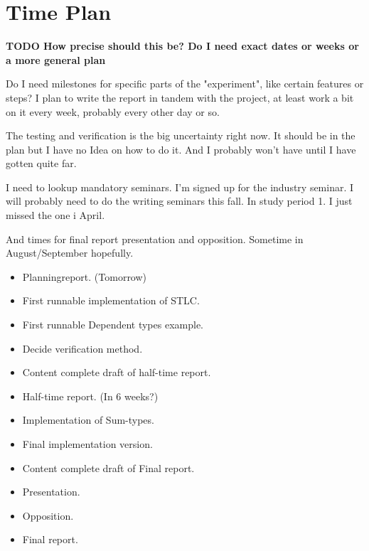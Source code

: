 \documentclass[parskip=half]{scrartcl}
\begin{document}
\section{Time Plan}
\textbf{TODO How precise should this be? Do I need exact dates or weeks or
a more general plan}


Do I need milestones for specific parts of the "experiment", like certain
features or steps? I plan to write the report in tandem with the project, at
least work a bit on it every week, probably every other day or so.

The testing and verification is the big uncertainty right now. It should be in
the plan but I have no Idea on how to do it. And I probably won't have until
I have gotten quite far.


I need to lookup mandatory seminars.
I'm signed up for the industry seminar.
I will probably need to do the writing seminars this fall. In study period 1.
I just missed the one i April.

And times for final report presentation and opposition.
Sometime in August/September hopefully.

\begin{itemize}
  \item Planningreport. (Tomorrow)
  \item First runnable implementation of STLC.
  \item First runnable Dependent types example.
  \item Decide verification method.
  \item Content complete draft of half-time report.
  \item Half-time report. (In 6 weeks?)
  \item Implementation of Sum-types.
  \item Final implementation version.
  \item Content complete draft of Final report.
  \item Presentation.
  \item Opposition.
  \item Final report.
\end{itemize}
\end{document}

